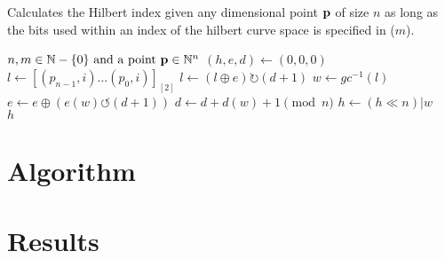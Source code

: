 \documentclass[10pt]{article}
\begin{document}
\begin{algorithm}
  \caption{Calculates the Hilbert index given any dimensional point ${\bf p}$ 
    of size $n$ as long as the bits used within an index of the hilbert curve 
    space is specified in ($m$).}
  \label{hilbert-point-to-index}
  \begin{algorithmic}[1]
    \Require $n, m \in \mathbb{N} - \{0\} \text{ and a point } {\bf p} \in \mathbb{N}^n$ 
    \State $ \left( h, e, d \right) \leftarrow \left( 0, 0, 0 \right) $
    \State $ l \leftarrow \left[ \left( p_{n-1} , i \right) \ldots \left( p_0 , i \right) \right]_{\left[ 2 \right]} $ 
    \State $ l \leftarrow \left( l \oplus e \right) \rightturn \left( d+1 \right)$ 
    \State $ w \leftarrow gc^{-1} \left( l \right)$ 
    \State $ e \leftarrow e \oplus \left( e \left( w \right) \leftturn \left( d+ 1 \right) \right) $ 
    \State $ d \leftarrow d + d \left( w \right) + 1 \pmod{n}$ 
    \State $ h \leftarrow \left( h \ll n \right) | w $
    \EndFor \\
    \Return $h $%

  \end{algorithmic}
\end{algorithm}

\section{Algorithm}

\section{Results}



\end{document}
